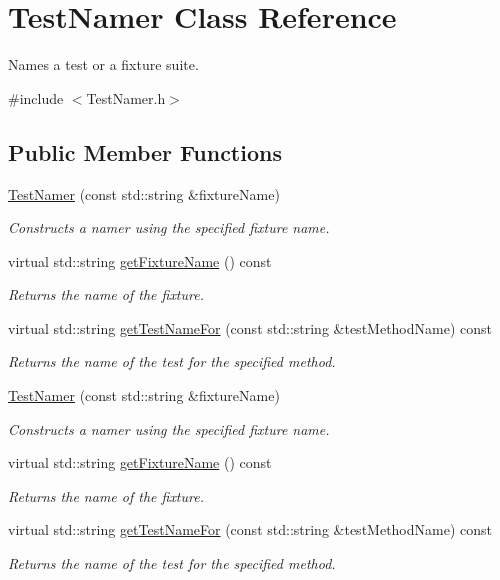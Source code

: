 \hypertarget{class_test_namer}{\section{Test\+Namer Class Reference}
\label{class_test_namer}
}


Names a test or a fixture suite.  




{\ttfamily \#include $<$Test\+Namer.\+h$>$}

\subsection*{Public Member Functions}
\begin{DoxyCompactItemize}
\item 
\hyperlink{class_test_namer_af4222b72f5ab0e5821c268863c19bc63}{Test\+Namer} (const std\+::string \&fixture\+Name)
\begin{DoxyCompactList}\small\item\em Constructs a namer using the specified fixture name. \end{DoxyCompactList}\item 
virtual std\+::string \hyperlink{class_test_namer_a19ff7fb473c7e238711996dcd3b733c4}{get\+Fixture\+Name} () const 
\begin{DoxyCompactList}\small\item\em Returns the name of the fixture. \end{DoxyCompactList}\item 
virtual std\+::string \hyperlink{class_test_namer_ac289f44ac9c17c2b5e47c0fa858211b8}{get\+Test\+Name\+For} (const std\+::string \&test\+Method\+Name) const 
\begin{DoxyCompactList}\small\item\em Returns the name of the test for the specified method. \end{DoxyCompactList}\item 
\hyperlink{class_test_namer_ae2c7e349fae02b71dae8e898946bca9e}{Test\+Namer} (const std\+::string \&fixture\+Name)
\begin{DoxyCompactList}\small\item\em Constructs a namer using the specified fixture name. \end{DoxyCompactList}\item 
virtual std\+::string \hyperlink{class_test_namer_a743cc0b154ff4e32d81feccd97917b62}{get\+Fixture\+Name} () const 
\begin{DoxyCompactList}\small\item\em Returns the name of the fixture. \end{DoxyCompactList}\item 
virtual std\+::string \hyperlink{class_test_namer_aa56007426b92b4c34bb2e98548419893}{get\+Test\+Name\+For} (const std\+::string \&test\+Method\+Name) const 
\begin{DoxyCompactList}\small\item\em Returns the name of the test for the specified method. \end{DoxyCompactList}\end{DoxyCompactItemize}
